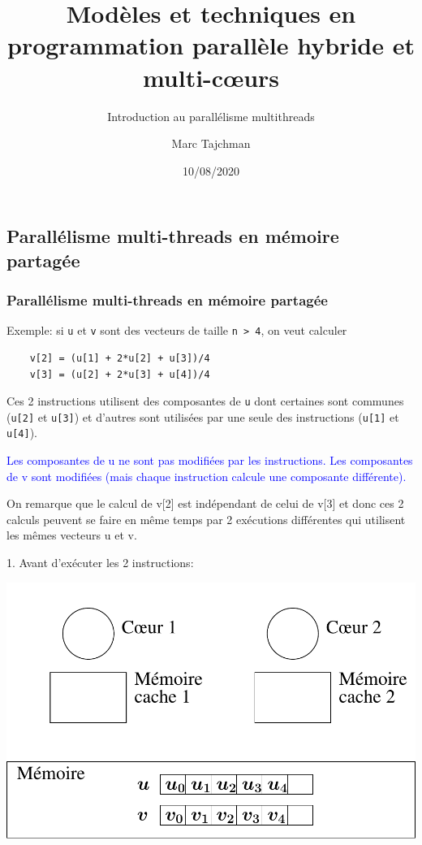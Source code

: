 \documentclass{beamer}
\title{Modèles et techniques en programmation parallèle hybride et multi-c\oe urs}
\subtitle{Introduction au parall\'elisme multithreads}
\author{Marc Tajchman}\institute{CEA - DEN/DM2S/STMF/LMES}
\date{10/08/2020}
\begin{document}
\begin{frame}
	\titlepage
\end{frame}

\large
\begin{frame}[fragile]
	\section{Parallélisme multi-threads en mémoire partagée}
	\frametitle{Parallélisme multi-threads en mémoire partagée}
	
	Exemple: si \verb|u| et \verb|v| sont des vecteurs de taille \verb|n > 4|, on veut calculer
	\begin{lstlisting}
	v[2] = (u[1] + 2*u[2] + u[3])/4
	v[3] = (u[2] + 2*u[3] + u[4])/4
	\end{lstlisting}
	
	\vfill
	Ces 2 instructions utilisent des composantes de \verb|u| dont certaines sont communes (\verb|u[2]| et \verb|u[3]|) et d'autres sont utilisées par une seule des instructions (\verb|u[1]| et \verb|u[4]|).
	
	\vfill
	\textcolor{blue}{Les composantes de u ne sont pas modifiées par les instructions.
	Les composantes de v sont modifiées (mais chaque instruction calcule une composante différente).}
	
	\vfill
	On remarque que le calcul de v[2] est indépendant de celui de v[3] et donc ces 2 calculs peuvent se faire en même temps par 2 ex\'ecutions différentes qui utilisent les mêmes vecteurs u et v.
		
\end{frame}

\begin{frame}
	\parbox[t][1cm]{10cm}{1. Avant d'exécuter les 2 instructions:}
   \begin{center}
   \includegraphics[scale=0.6]{../Images/multithread0}
   \end{center}
\end{frame}
\end{document}
